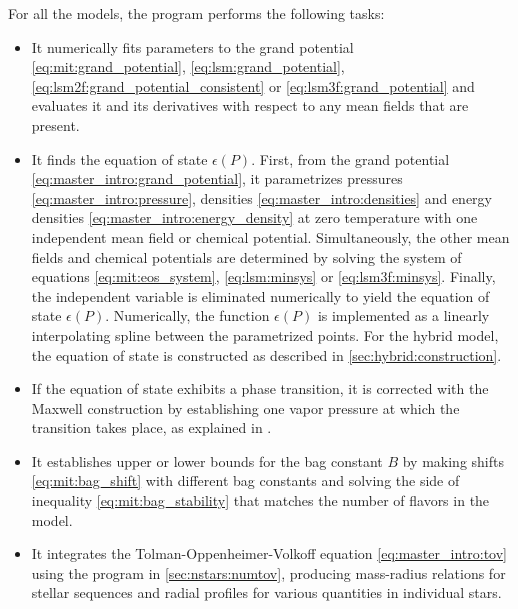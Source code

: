 \pagebreak
For all the models, the program performs the following tasks:
\begin{itemize}
\item It numerically fits parameters to the grand potential
      \eqref{eq:mit:grand_potential}, \eqref{eq:lsm:grand_potential}, \eqref{eq:lsm2f:grand_potential_consistent} or \eqref{eq:lsm3f:grand_potential}
      and evaluates it and its derivatives with respect to any mean fields that are present.
\item It finds the equation of state $\epsilon(P)$.
      First, from the grand potential \eqref{eq:master_intro:grand_potential},
      it parametrizes pressures \eqref{eq:master_intro:pressure}, densities \eqref{eq:master_intro:densities} and energy densities \eqref{eq:master_intro:energy_density} at zero temperature
      with one independent mean field or chemical potential.
      Simultaneously, the other mean fields and chemical potentials are determined by solving the system of equations
      \eqref{eq:mit:eos_system}, \eqref{eq:lsm:minsys} or \eqref{eq:lsm3f:minsys}.
      Finally, the independent variable is eliminated numerically to yield the equation of state $\epsilon(P)$.
      Numerically, the function $\epsilon(P)$ is implemented as a linearly interpolating spline between the parametrized points.
      For the hybrid model,
      the equation of state is constructed as described in \cref{sec:hybrid:construction}.
\item If the equation of state exhibits a phase transition,
      it is corrected with the Maxwell construction
      by establishing one vapor pressure at which the transition takes place,
      as explained in \cite[equation (4.69)]{ref:master_francesco}.
\item It establishes upper or lower bounds for the bag constant $B$
      by making shifts \eqref{eq:mit:bag_shift} with different bag constants
      and solving the side of inequality \eqref{eq:mit:bag_stability} that matches the number of flavors in the model.
\item It integrates the Tolman-Oppenheimer-Volkoff equation \eqref{eq:master_intro:tov}
      using the program in \cref{sec:nstars:numtov},
      producing mass-radius relations for stellar sequences and radial profiles for various quantities in individual stars.
\end{itemize}


